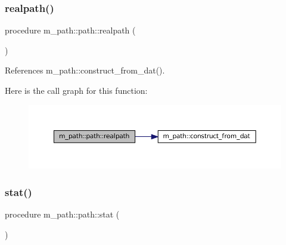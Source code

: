 \mbox{\label{structm__path_1_1path_a2face141118fc136a54b08f2b46738bb}} 
\subsubsection{\texorpdfstring{realpath()}{realpath()}}
{\footnotesize\ttfamily procedure m\+\_\+path\+::path\+::realpath (\begin{DoxyParamCaption}{ }\end{DoxyParamCaption})\hspace{0.3cm}{\ttfamily [private]}}



References m\+\_\+path\+::construct\+\_\+from\+\_\+dat().

Here is the call graph for this function\+:\nopagebreak
\begin{figure}[H]
\begin{center}
\leavevmode
\includegraphics[width=350pt]{structm__path_1_1path_a2face141118fc136a54b08f2b46738bb_cgraph}
\end{center}
\end{figure}
\mbox{\label{structm__path_1_1path_a69cc8aabf4b8530c82bd133fd641227b}} 
\subsubsection{\texorpdfstring{stat()}{stat()}}
{\footnotesize\ttfamily procedure m\+\_\+path\+::path\+::stat (\begin{DoxyParamCaption}{ }\end{DoxyParamCaption})\hspace{0.3cm}{\ttfamily [private]}}

\mbox{\label{structm__path_1_1path_a9f4b8368bb43f15d23ba5b17b3b3b901}} 
